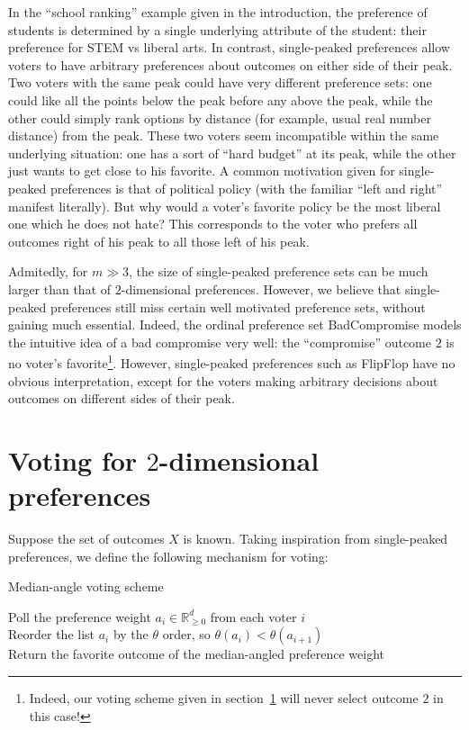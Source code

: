 \documentclass[12pt]{article}
\newcommand{\Rgz}{\mathbb{R}_{\ge 0}}
\newcommand{\1}[1]{\mathds{1}[{#1}]}
\begin{document}
  In the ``school ranking'' example given in the introduction, the preference of
  students is determined by a single underlying attribute of the student:
  their preference for STEM vs liberal arts.
  In contrast, single-peaked preferences allow voters to have arbitrary
  preferences about outcomes on either side of their peak.
  Two voters with the same peak could have very different preference sets:
  one could like all the points below the peak before any above the peak,
  while the other could simply rank options by distance (for example,
  usual real number distance) from the peak.
  These two voters seem incompatible within the same underlying situation:
  one has a sort of ``hard budget'' at its peak, while the other just
  wants to get close to his favorite.
  A common motivation given for single-peaked preferences is that of political
  policy (with the familiar ``left and right'' manifest literally).
  But why would a voter's favorite policy be the most liberal one which he does
  not hate? This corresponds to the voter who prefers all outcomes right of his
  peak to all those left of his peak.

  Admitedly, for $m \gg 3$, the size of single-peaked preference sets can be
  much larger than that of $2$-dimensional preferences.
  However, we believe that single-peaked preferences still miss certain well
  motivated preference sets, without gaining much essential.
  Indeed, the ordinal preference set {\sc BadCompromise} models the intuitive
  idea of a bad compromise very well: the ``compromise'' outcome $2$ is
  no voter's favorite\footnote{
    Indeed, our voting scheme given in section~\ref{sec:voting} will never
    select outcome $2$ in this case!
  }. However, single-peaked preferences such as {\sc FlipFlop} have no obvious
  interpretation, except for the voters making arbitrary decisions about
  outcomes on different sides of their peak.

\section{Voting for $2$-dimensional preferences}
  \label{sec:voting}

  Suppose the set of outcomes $X$ is known.
  Taking inspiration from single-peaked preferences, we define the following
  mechanism for voting:

  \begin{algorithm}
    \caption{Median-angle voting scheme}
    Poll the preference weight $a_i\in\Rgz^d$ from each voter $i$ \\
    Reorder the list $a_i$ by the $\theta$ order, so 
      $\theta(a_i) < \theta(a_{i+1})$ \\
    Return the favorite outcome of the median-angled preference weight
  \end{algorithm}
\end{document}

